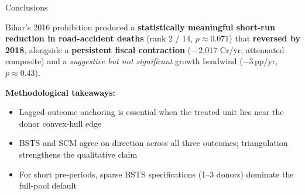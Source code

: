 \documentclass[aspectratio=169,11pt]{beamer}
\newcommand{\navy}[1]{\textcolor{NavyPrimary}{\textbf{#1}}}
\newcommand{\greentext}[1]{\textcolor{SuccessGreen!80!black}{\textbf{#1}}}
\newcommand{\redtext}[1]{\textcolor{DangerRed}{\textbf{#1}}}
\newcommand{\rupee}{\faRupeeSign\,}
\newcommand{\toptight}{\vspace{-0.15cm}}
\begin{document}
\begin{frame}{Conclusions}
  \toptight
  \vspace{0.2cm}
  \begin{tcolorbox}[navybox,title={\faAward\enspace Headline}]
    \footnotesize
    Bihar's 2016 prohibition produced a \greentext{statistically meaningful
    short-run reduction in road-accident deaths} (rank 2 / 14, $p \approx
    0.071$) that \redtext{reversed by 2018}, alongside a \redtext{persistent
    fiscal contraction} ($-$\rupee 2{,}017 Cr/yr, attenuated composite) and
    a \emph{suggestive but not significant} growth headwind
    ($-3$\,pp/yr, $p \approx 0.43$).
  \end{tcolorbox}

  \vspace{0.30cm}
  \textbf{\navy{\small Methodological takeaways:}}
  \begin{itemize}
    \item Lagged-outcome anchoring is essential when the treated unit lies
          near the donor convex-hull edge
    \item BSTS and SCM agree on direction across all three outcomes;
          triangulation strengthens the qualitative claim
    \item For short pre-periods, sparse BSTS specifications (1--3 donors)
          dominate the full-pool default
  \end{itemize}
\end{frame}
\end{document}
